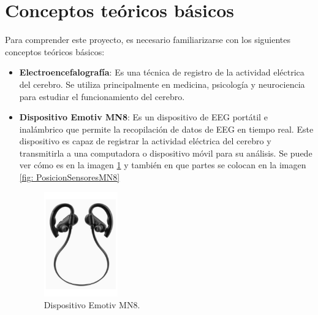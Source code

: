 
\section{Conceptos teóricos básicos}

Para comprender este proyecto, es necesario familiarizarse con los siguientes conceptos teóricos básicos:
\begin{itemize}
    \item \textbf{Electroencefalografía}: Es una técnica de registro de la actividad eléctrica del cerebro. Se utiliza principalmente en medicina, psicología y neurociencia para estudiar el funcionamiento del cerebro.
    \item \textbf{Dispositivo Emotiv MN8}: Es un dispositivo de EEG portátil e inalámbrico que permite la recopilación de datos de EEG en tiempo real. Este dispositivo es capaz de registrar la actividad eléctrica del cerebro y transmitirla a una computadora o dispositivo móvil para su análisis. Se puede ver cómo es en la imagen \ref{fig: EmotivMN8} y también en que partes se colocan en la imagen \ref{fig: PosicionSensoresMN8}
    \begin{figure}[h]
    \centering
    \includegraphics[width=0.3\textwidth]{img/DispositivoEmotivMN8.pdf}
    \caption{Dispositivo Emotiv MN8.}
    \label{fig: EmotivMN8}
    \end{figure}
    

\end{itemize}

